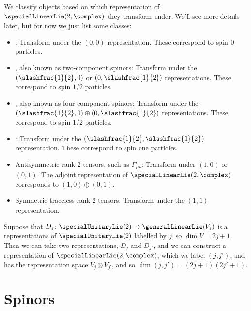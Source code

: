 \documentclass[fleqn]{NotesClass}
\begin{document}
    We classify objects based on which representation of \(\specialLinearLie(2, \complex)\) they transform under.
    We'll see more details later, but for now we just list some classes:
    \begin{itemize}
        \item {}: Transform under the \((0, 0)\) representation.
        These correspond to spin 0 particles.
        \item {}, also known as two-component spinors: Transform under the \((\slashfrac{1}{2}, 0)\) or \((0, \slashfrac{1}{2})\) representations.
        These correspond to spin \(1/2\) particles.
        \item {}, also known as four-component spinors: Transform under the \((\slashfrac{1}{2}, 0) \oplus (0, \slashfrac{1}{2})\) representations.
        These correspond to spin \(1/2\) particles.
        \item {}: Transform under the \((\slashfrac{1}{2}, \slashfrac{1}{2})\) representation.
        These correspond to spin one particles.
        \item Antisymmetric rank 2 tensors, such as \(F_{\mu\nu}\): Transform under \((1, 0)\) or \((0, 1)\).
        The adjoint representation of \(\specialLinearLie(2, \complex)\) corresponds to \((1, 0) \oplus (0, 1)\).
        \item Symmetric traceless rank 2 tensors: Transform under the \((1, 1)\) representation.
    \end{itemize}
    
    Suppose that \(D_j \colon \specialUnitaryLie(2) \to \generalLinearLie(V_j)\) is a representations of \(\specialUnitaryLie(2)\) labelled by \(j\), so \(\dim V = 2j + 1\).
    Then we can take two representations, \(D_j\) and \(D_{j'}\), and we can construct a representation of \(\specialLinearLie(2, \complex)\), which we label \((j, j')\), and has the representation space \(V_j \otimes V_{j'}\), and so \(\dim(j, j') = (2j + 1)(2j' + 1)\).
    
    \chapter{Spinors}
\end{document}
